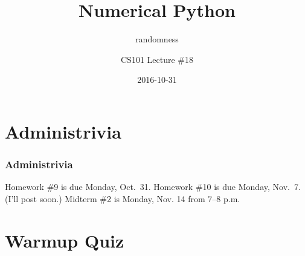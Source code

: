 \documentclass[11pt]{beamer}
\title{Numerical Python}
\subtitle{randomness}
\author{CS101 Lecture \#18}
\date{2016-10-31}
\begin{document}
  \setcounter{showProgressBar}{0}
  \setcounter{showSlideNumbers}{0}

\frame{\titlepage}

\setcounter{framenumber}{0}
\setcounter{showProgressBar}{1}
\setcounter{showSlideNumbers}{1}

\section{Administrivia}

\begin{frame}
  \frametitle{Administrivia}
  \Enlarge

  \begin{itemize}
  \myitem  Homework \#9 is due Monday, Oct.\ 31.
  \myitem  Homework \#10 is due Monday, Nov.\ 7.  \textcolor{CS101Alt}{(I'll post soon.)}
  \myitem  Midterm \#2 is Monday, Nov. 14 from 7–8 p.m.
  \end{itemize}
\end{frame}

\section{Warmup Quiz}
\end{document}
